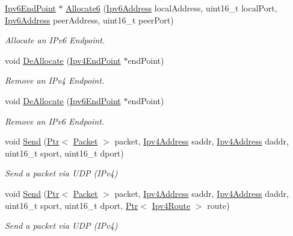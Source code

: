 \begin{DoxyCompactItemize}
\hyperlink{classns3_1_1Ipv6EndPoint}{Ipv6\+End\+Point} $\ast$ \hyperlink{classns3_1_1UdpL4Protocol_a0173cfb1ecb366424f6dca8ddc503415}{Allocate6} (\hyperlink{classns3_1_1Ipv6Address}{Ipv6\+Address} local\+Address, uint16\+\_\+t local\+Port, \hyperlink{classns3_1_1Ipv6Address}{Ipv6\+Address} peer\+Address, uint16\+\_\+t peer\+Port)
\begin{DoxyCompactList}\small\item\em Allocate an I\+Pv6 Endpoint. \end{DoxyCompactList}\item 
void \hyperlink{classns3_1_1UdpL4Protocol_abf4aa2b01fbf39183abff159a492372a}{De\+Allocate} (\hyperlink{classns3_1_1Ipv4EndPoint}{Ipv4\+End\+Point} $\ast$end\+Point)
\begin{DoxyCompactList}\small\item\em Remove an I\+Pv4 Endpoint. \end{DoxyCompactList}\item 
void \hyperlink{classns3_1_1UdpL4Protocol_a985646d1c5cfe74cfef06872239b0bb6}{De\+Allocate} (\hyperlink{classns3_1_1Ipv6EndPoint}{Ipv6\+End\+Point} $\ast$end\+Point)
\begin{DoxyCompactList}\small\item\em Remove an I\+Pv6 Endpoint. \end{DoxyCompactList}\item 
void \hyperlink{classns3_1_1UdpL4Protocol_a1101c5599b8a48d8f1b2dc1952a5e9b4}{Send} (\hyperlink{classns3_1_1Ptr}{Ptr}$<$ \hyperlink{classns3_1_1Packet}{Packet} $>$ packet, \hyperlink{classns3_1_1Ipv4Address}{Ipv4\+Address} saddr, \hyperlink{classns3_1_1Ipv4Address}{Ipv4\+Address} daddr, uint16\+\_\+t sport, uint16\+\_\+t dport)
\begin{DoxyCompactList}\small\item\em Send a packet via U\+DP (I\+Pv4) \end{DoxyCompactList}\item 
void \hyperlink{classns3_1_1UdpL4Protocol_a9772e559e722088db44cc31afb133758}{Send} (\hyperlink{classns3_1_1Ptr}{Ptr}$<$ \hyperlink{classns3_1_1Packet}{Packet} $>$ packet, \hyperlink{classns3_1_1Ipv4Address}{Ipv4\+Address} saddr, \hyperlink{classns3_1_1Ipv4Address}{Ipv4\+Address} daddr, uint16\+\_\+t sport, uint16\+\_\+t dport, \hyperlink{classns3_1_1Ptr}{Ptr}$<$ \hyperlink{classns3_1_1Ipv4Route}{Ipv4\+Route} $>$ route)
\begin{DoxyCompactList}\small\item\em Send a packet via U\+DP (I\+Pv4) \end{DoxyCompactList}\item 

\end{DoxyCompactItemize}
